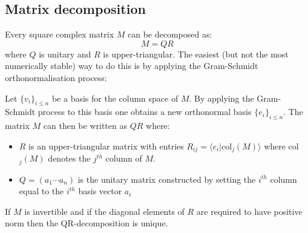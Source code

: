 \subsection{Matrix decomposition}

	\begin{method}[QR Decomposition]
		Every square complex matrix $M$ can be decomposed as:
		\begin{equation}
			M = QR
		\end{equation}
		where $Q$ is unitary and $R$ is upper-triangular. The easiest (but not the most numerically stable) way to do this is by applying the Gram-Schmidt orthonormalisation process:
		
		Let $\{v_i\}_{i\leq n}$ be a basis for the column space of $M$. By applying the Gram-Schmidt process to this basis one obtains a new orthonormal basis $\{e_i\}_{i\leq n}$. The matrix $M$ can then be written as $QR$ where:
		\begin{itemize}
			\item $R$ is an upper-triangular matrix with entries $R_{ij} = \langle e_i|\text{col}_j(M) \rangle$ where col$_j(M)$ denotes the $j^{th}$ column of $M$.
			\item $Q = (a_1\cdots a_n)$ is the unitary matrix constructed by setting the $i^{th}$ column equal to the $i^{th}$ basis vector $a_i$ 
		\end{itemize}
	\end{method}
	\begin{property}
		If $M$ is invertible and if the diagonal elements of $R$ are required to have positive norm then the QR-decomposition is unique.
	\end{property}
